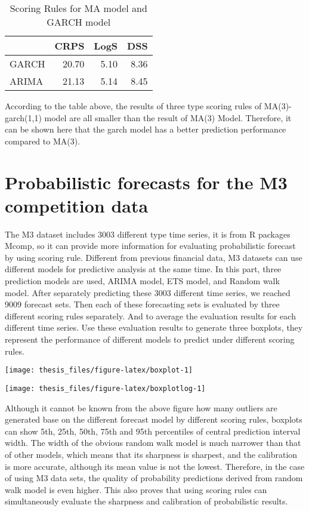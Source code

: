 \documentclass{monashthesis}
\theoremstyle{definition}
\theoremstyle{definition}
\theoremstyle{definition}
\theoremstyle{remark}
\begin{document}
\begin{table}

\caption{\label{tab:table2}Scoring Rules for MA model and GARCH model}
\centering
\begin{tabular}[t]{lrrr}
\toprule
  & CRPS & LogS & DSS\\
\midrule
GARCH & 20.70 & 5.10 & 8.36\\
ARIMA & 21.13 & 5.14 & 8.45\\
\bottomrule
\end{tabular}
\end{table}

According to the table above, the results of three type scoring rules of
MA(3)-garch(1,1) model are all smaller than the result of MA(3) Model.
Therefore, it can be shown here that the garch model has a better
prediction performance compared to MA(3).

\chapter{Probabilistic forecasts for the M3 competition
data}\label{probabilistic-forecasts-for-the-m3-competition-data}

The M3 dataset includes 3003 different type time series, it is from R
packages Mcomp, so it can provide more information for evaluating
probabilistic forecast by using scoring rule. Different from previous
financial data, M3 datasets can use different models for predictive
analysis at the same time. In this part, three prediction models are
used, ARIMA model, ETS model, and Random walk model. After separately
predicting these 3003 different time series, we reached 9009 forecast
sets. Then each of these forecasting sets is evaluated by three
different scoring rules separately. And to average the evaluation
results for each different time series. Use these evaluation results to
generate three boxplots, they represent the performance of different
models to predict under different scoring rules.

\texttt{[image: thesis\_files/figure-latex/boxplot-1]}

\texttt{[image: thesis\_files/figure-latex/boxplotlog-1]}

Although it cannot be known from the above figure how many outliers are
generated base on the different forecast model by different scoring
rules, boxplots can show 5th, 25th, 50th, 75th and 95th percentiles of
central prediction interval width. The width of the obvious random walk
model is much narrower than that of other models, which means that its
sharpness is sharpest, and the calibration is more accurate, although
its mean value is not the lowest. Therefore, in the case of using M3
data sets, the quality of probability predictions derived from random
walk model is even higher. This also proves that using scoring rules can
simultaneously evaluate the sharpness and calibration of probabilistic
results.
\end{document}
